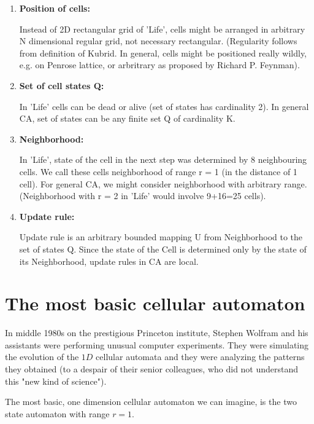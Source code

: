 \begin{enumerate}
\item \textbf{Position of cells:}

Instead of 2D rectangular grid of 'Life',
cells might be arranged in arbitrary N dimensional
regular grid, not necessary rectangular. 
(Regularity follows from definition of Kubrid. In general, cells might be positioned really wildly,
e.g. on Penrose lattice, or arbritrary as proposed by Richard P. Feynman).

\item \textbf{Set of cell states Q:}

In 'Life' cells can be dead or alive (set of states has cardinality 2). 
In general CA, set of states can be any finite set Q of cardinality K.
\bigskip

\item \textbf{Neighborhood:}

In 'Life', state of the cell in the next step was determined
by 8 neighbouring cells. We call these cells neighborhood of range r = 1 (in the distance of 1 cell).
For general CA, we might consider neighborhood
with arbitrary range.
(Neighborhood with r = 2 in 'Life' would involve 9+16=25 cells).

\item \textbf{Update rule:}

Update rule is an arbitrary bounded mapping U from Neighborhood to the set of states Q.
Since the state of the Cell is determined only by the state of its Neighborhood, update rules in CA are local.

\end{enumerate}


\section{The most basic cellular automaton} 

In middle 1980s on the prestigious Princeton institute,
Stephen Wolfram and his assistants were performing unusual computer experiments. They were simulating the evolution of the $1D$ cellular automata and they were analyzing the patterns they obtained \cite{levy} (to a despair of their senior colleagues, who did not understand this "new kind of science")\cite{wolfram}.

The most basic, one dimension cellular automaton we can imagine, is the two state automaton with range $r=1$.

